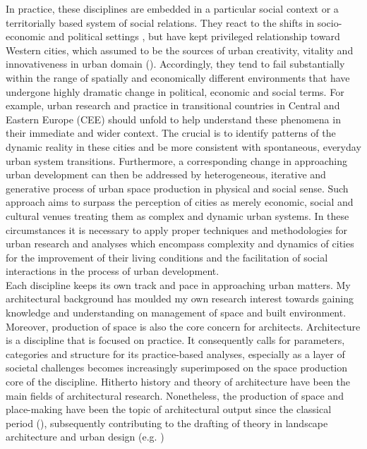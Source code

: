 \documentclass[11pt]{report}
\begin{document}
In practice, these disciplines are embedded in a particular social context or a territorially based system of social relations. They react to the shifts in socio-economic and political settings \href{Tsenkova, 2006b}{\citealt{Tsenkova, 2006b}}, but have kept privileged relationship toward Western cities, which assumed to be the sources of urban creativity, vitality and innovativeness in urban domain (\href{Robinson, 2006:2}{\citealt{Robinson, 2006:2}}). Accordingly, they tend to fail substantially within the range of spatially and economically different environments that have undergone highly dramatic change in political, economic and social terms. For example, urban research and practice in transitional countries in Central and Eastern Europe (CEE) should unfold to help understand these phenomena in their immediate and wider context. The crucial is to identify patterns of the dynamic reality in these cities and be more consistent with spontaneous, everyday urban system transitions. Furthermore, a corresponding change in approaching urban development can then be addressed by heterogeneous, iterative and generative process of urban space production in physical and social sense. Such approach aims to surpass the perception of cities as merely economic, social and cultural venues treating them as complex and dynamic urban systems. In these circumstances it is necessary to apply proper techniques and methodologies for urban research and analyses which encompass complexity and dynamics of cities for the improvement of their living conditions and the facilitation of social interactions in the process of urban development.
\\
Each discipline keeps its own track and pace in approaching urban matters. My architectural background has moulded my own research interest towards gaining knowledge and understanding on management of space and built environment. Moreover, production of space is also the core concern for architects. Architecture is a discipline that is focused on practice. It consequently calls for parameters, categories and structure for its practice-based analyses, especially as a layer of societal challenges becomes increasingly superimposed on the space production core of the discipline.  
Hitherto history and theory of architecture have been the main fields of architectural research.
Nonetheless, the production of space and place-making have been the topic of architectural output since the classical period  (\href{Braunfels, 1990; Rossi, 1982; Vitruvius, 20BC; from Van Assche et al. 2013}{\citealt{Braunfels, 1990; Rossi, 1982; Vitruvius, 20BC; from Van Assche et al. 2013}}), subsequently contributing to the drafting of theory in landscape architecture and urban design (e.g. \href{Child, 2010; Braunfels, 1990; Rossi, 1982; Duany and Plater-Zyberk, 1991; Lynch, 1981 from Van Assche et al. 2013}{\citealt{Child, 2010; Braunfels, 1990; Rossi, 1982; Duany and Plater-Zyberk, 1991; Lynch, 1981 from Van Assche et al. 2013}})
\end{document}

